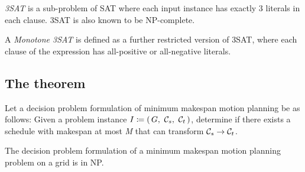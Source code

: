 \begin{definition}
	\emph{3SAT} is a sub-problem of SAT where each input instance has exactly 3 literals in each clause. 
	3SAT is also known to be NP-complete.
\end{definition}

\begin{definition}
	A \emph{Monotone 3SAT} is defined as a further restricted version of 3SAT, where each clause of the expression has all-positive or all-negative literals.
\end{definition}










\subsection{The theorem}

Let a decision problem formulation of minimum makespan motion planning be as follows: Given a problem instance \(I \coloneqq \parens{G,\ \conf{s},\ \conf{t}}\), determine if there exists a schedule with makespan at most \emph{M} that can transform \(\mathcal{C}_{s} \rightarrow \mathcal{C}_{t}\).

\begin{lemma}\label{lemma:np}
	The decision problem formulation of a minimum makespan motion planning problem on a grid is in NP.
\end{lemma}

